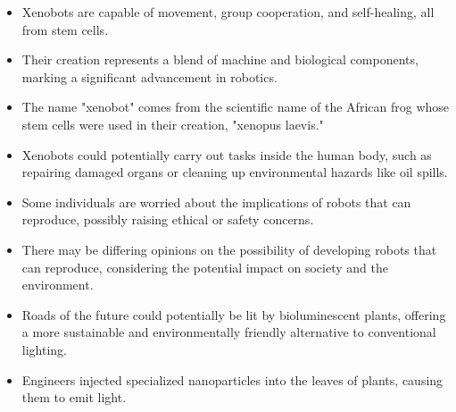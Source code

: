 \begin{itemize}
      \item Xenobots are capable of movement, group cooperation, and self-healing, all from stem cells.
      \item Their creation represents a blend of machine and biological components, marking a significant advancement in robotics.
\end{itemize}

\begin{itemize}
      \item The name "xenobot" comes from the scientific name of the African frog whose stem cells were used in their creation, "xenopus laevis."
\end{itemize}

\begin{itemize}
      \item Xenobots could potentially carry out tasks inside the human body, such as repairing damaged organs or cleaning up environmental hazards like oil spills.
\end{itemize}

\begin{itemize}
      \item Some individuals are worried about the implications of robots that can reproduce, possibly raising ethical or safety concerns.
\end{itemize}

\begin{itemize}
      \item There may be differing opinions on the possibility of developing robots that can reproduce, considering the potential impact on society and the environment.
\end{itemize}

\begin{itemize}
      \item Roads of the future could potentially be lit by bioluminescent plants, offering a more sustainable and environmentally friendly alternative to conventional lighting.
\end{itemize}

\begin{itemize}
      \item Engineers injected specialized nanoparticles into the leaves of plants, causing them to emit light.
\end{itemize}

